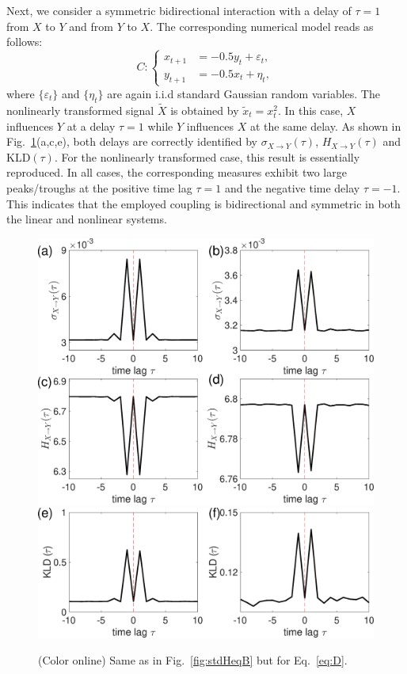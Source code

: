 \documentclass[12pt,aip,cha,reprint,nofootinbib]{revtex4-1}
\begin{document}
Next, we consider a symmetric bidirectional interaction with a delay of $\tau = 1$ from $X$ to $Y$ and from $Y$ to $X$. The corresponding numerical model reads as follows: 
\begin{equation} \label{eq:D}
C: \left \{ \begin{aligned}
x_{t+1} &= - 0.5 y_{t} + \varepsilon_t, \\
y_{t+1} &= - 0.5 x_{t} + \eta_t, 
\end{aligned}
\right.
\end{equation}
where $\{ \varepsilon_t \}$ and $\{ \eta_t \}$ are again i.i.d standard Gaussian random variables. The nonlinearly transformed signal $\tilde{X}$ is obtained by $\tilde{x}_{t} = x_{t}^{2}$. In this case, $X$ influences $Y$ at a delay $\tau = 1$ while $Y$ influences $X$ at the same delay. As shown in Fig.~\ref{fig:stdHeqD}(a,c,e), both delays are correctly identified by $\sigma_{X \to Y}(\tau)$, $H_{X \to Y}(\tau)$ and $\text{KLD}(\tau)$. For the nonlinearly transformed case, this result is essentially reproduced. In all cases, the corresponding measures exhibit two large peaks/troughs at the positive time lag $\tau = 1$ and the negative time delay $\tau = -1 $. This indicates that the employed coupling is bidirectional and symmetric in both the linear and nonlinear systems. 

\begin{figure}
	\centering
	\includegraphics[width=\columnwidth]{E_D.eps}
	\includegraphics[width=\columnwidth]{KL_D.eps}
\caption{(Color online) Same as in Fig.~\ref{fig:stdHeqB} but for Eq.~\eqref{eq:D}.   \label{fig:stdHeqD}}
\end{figure}
\end{document}
